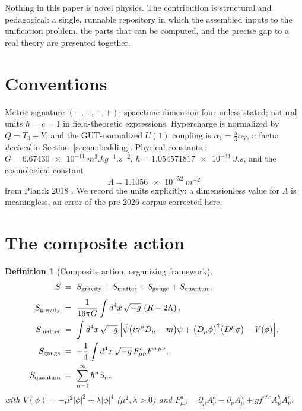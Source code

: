 \documentclass[11pt]{article}
\newtheorem{definition}{Definition}
\theoremstyle{remark}
\begin{document}
Nothing in this paper is novel physics. The contribution is structural
and pedagogical: a single, runnable repository in which the assembled
inputs to the unification problem, the parts that can be computed, and
the precise gap to a real theory are presented together.

\section{Conventions}

Metric signature $(-,+,+,+)$; spacetime dimension four unless stated;
natural units $\hbar = c = 1$ in field-theoretic expressions.
Hypercharge is normalized by $Q = T_3 + Y$, and the GUT-normalized
$U(1)$ coupling is $\alpha_1 = \frac{5}{3}\alpha_Y$, a factor
\emph{derived} in Section~\ref{sec:embedding}. Physical constants
\cite{pdg}: $G = \SI{6.67430e-11}{m^3.kg^{-1}.s^{-2}}$,
$\hbar = \SI{1.054571817e-34}{J.s}$, and the cosmological constant
\begin{equation}
\Lambda = \SI{1.1056e-52}{m^{-2}}
\end{equation}
from Planck 2018 \cite{planck}. We record the units explicitly: a
dimensionless value for $\Lambda$ is meaningless, an error of the
pre-2026 corpus corrected here.

\section{The composite action}
\label{sec:action}

\begin{definition}[Composite action; organizing framework]
\label{def:composite}
\begin{align}
S \;&=\; S_{\mathrm{gravity}} + S_{\mathrm{matter}}
        + S_{\mathrm{gauge}} + S_{\mathrm{quantum}},\\[4pt]
S_{\mathrm{gravity}} \;&=\; \frac{1}{16\pi G}\int d^4x\,\sqrt{-g}\,
        \left(R - 2\Lambda\right),\\
S_{\mathrm{matter}} \;&=\; \int d^4x\,\sqrt{-g}\,
        \Bigl[\bar{\psi}\bigl(i\gamma^{\mu}D_{\mu}-m\bigr)\psi
        + \bigl(D_{\mu}\phi\bigr)^{\dagger}\bigl(D^{\mu}\phi\bigr)
        - V(\phi)\Bigr],\\
S_{\mathrm{gauge}} \;&=\; -\frac{1}{4}\int d^4x\,\sqrt{-g}\,
        F^{a}_{\mu\nu}F^{a\,\mu\nu},\\
S_{\mathrm{quantum}} \;&=\; \sum_{n=1}^{\infty}\hbar^{n}S_{n},
\end{align}
with $V(\phi) = -\mu^2|\phi|^2 + \lambda|\phi|^4$ ($\mu^2,\lambda>0$)
and $F^{a}_{\mu\nu} = \partial_{\mu}A^{a}_{\nu} -
\partial_{\nu}A^{a}_{\mu} + g f^{abc}A^{b}_{\mu}A^{c}_{\nu}$.
\end{definition}
\end{document}
